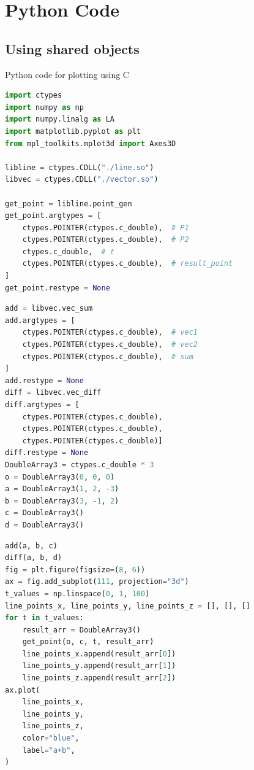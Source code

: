 \documentclass{beamer}
\theoremstyle{remark}
\numberwithin{equation}{section}
\begin{document}
\section{Python Code}
\subsection{Using shared objects}
\begin{frame}[fragile]{Python code for plotting using C}
\begin{lstlisting}[language=Python]
import ctypes
import numpy as np
import numpy.linalg as LA
import matplotlib.pyplot as plt
from mpl_toolkits.mplot3d import Axes3D

libline = ctypes.CDLL("./line.so")
libvec = ctypes.CDLL("./vector.so")

get_point = libline.point_gen
get_point.argtypes = [
    ctypes.POINTER(ctypes.c_double),  # P1
    ctypes.POINTER(ctypes.c_double),  # P2
    ctypes.c_double,  # t
    ctypes.POINTER(ctypes.c_double),  # result_point
]
get_point.restype = None
\end{lstlisting}
\end{frame}
\begin{frame}[fragile]
 \begin{lstlisting}[language=Python]
add = libvec.vec_sum
add.argtypes = [
    ctypes.POINTER(ctypes.c_double),  # vec1
    ctypes.POINTER(ctypes.c_double),  # vec2
    ctypes.POINTER(ctypes.c_double),  # sum
]
add.restype = None
diff = libvec.vec_diff
diff.argtypes = [
    ctypes.POINTER(ctypes.c_double),
    ctypes.POINTER(ctypes.c_double),
    ctypes.POINTER(ctypes.c_double)]
diff.restype = None
DoubleArray3 = ctypes.c_double * 3
o = DoubleArray3(0, 0, 0)
a = DoubleArray3(1, 2, -3)
b = DoubleArray3(3, -1, 2)
c = DoubleArray3()
d = DoubleArray3()
 \end{lstlisting}
\end{frame}
\begin{frame}[fragile]
 \begin{lstlisting}[language=Python]
add(a, b, c)
diff(a, b, d)
fig = plt.figure(figsize=(8, 6))
ax = fig.add_subplot(111, projection="3d")
t_values = np.linspace(0, 1, 100)
line_points_x, line_points_y, line_points_z = [], [], []
for t in t_values:
    result_arr = DoubleArray3()
    get_point(o, c, t, result_arr)
    line_points_x.append(result_arr[0])
    line_points_y.append(result_arr[1])
    line_points_z.append(result_arr[2])
ax.plot(
    line_points_x,
    line_points_y,
    line_points_z,
    color="blue",
    label="a+b",
)
 \end{lstlisting}
\end{frame}
\end{document}
